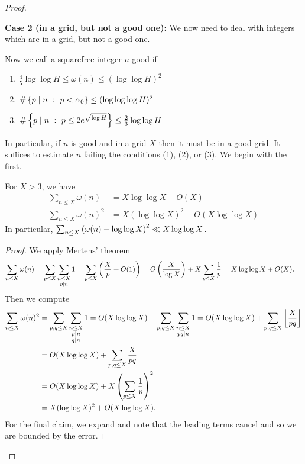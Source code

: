 \documentclass{lecturenotes}
\numberwithin{equation}{section}
\begin{document}
\begin{proof}
\begin{enumerate}
    \end{enumerate}

\textbf{Case 2 (in a grid, but not a good one):} We now need to deal with integers which are in a grid, but not a good one.
\begin{definition}\label{def:good integer}
Now we call a squarefree integer $n$ good if 
\begin{enumerate}
    \item $\frac{4}{5}\log\log H\leq \omega(n)\leq (\log\log H)^2$
    \item $\#\left\{{p\mid n~:~p<\alpha_0}\right\}\leq (\log\log\log H)^2$
    \item $\#\left\{{p\mid n~:~p\leq 2e^{\sqrt{\log H}}}\right\}\leq \frac{2}{3}\log\log H$ 
\end{enumerate}
\end{definition}

In particular, if $n$ is good and in a grid $X$ then it must be in a good grid.  It suffices to estimate $n$ failing the conditions (1), (2), or (3).  We begin with the first.

\begin{lemma}\label{lem:secondmomentomega}
    For $X>3$, we have
    \begin{align*}
    \sum_{n\leq X}\omega(n)&=X\log\log X + O(X)\\
    \sum_{n\leq X}\omega(n)^2&=X(\log\log X)^2 + O(X\log\log X)
    \end{align*}
    In particular, $\sum_{n\leq X}\left({\omega(n)-\log\log X}\right)^2\ll X\log\log X$.
\end{lemma}
\begin{proof} We apply Mertens' theorem
\begin{align*}
    \sum_{n\leq X}\omega(n)&=
    \sum_{p\leq X}\sum_{\substack{n\leq X\\p\mid n}}1
    =\sum_{p\leq X}\left({\frac{X}{p}+O(1)}\right)
    =O\left({\frac{X}{\log X}}\right)+X\sum_{p\leq X}\frac{1}{p}
    =X\log\log X+O(X).
\end{align*}
Then we compute
\begin{align*}
    \sum_{n\leq X}\omega(n)^2&=
    \sum_{p,q\leq X}\sum_{\substack{n\leq X\\p\mid n\\q\mid n}}1
    =O(X\log\log X)+\sum_{p,q\leq X}\sum_{\substack{n\leq X\\pq\mid n}}1
    =O(X\log\log X)+\sum_{p,q\leq X}\left\lfloor\frac{X}{pq}\right\rfloor
    \\&= O(X\log\log X)+\sum_{p,q\leq X}\frac{X}{pq}
    \\&=O(X\log\log X)+X\left({\sum_{p\leq X}\frac{1}{p}}\right)^2
    \\&=X(\log\log X)^2+O(X\log\log X).
\end{align*}
For the final claim, we expand and note that the leading terms cancel and so we are bounded by the error.
\end{proof}


\end{proof}
\end{document}

